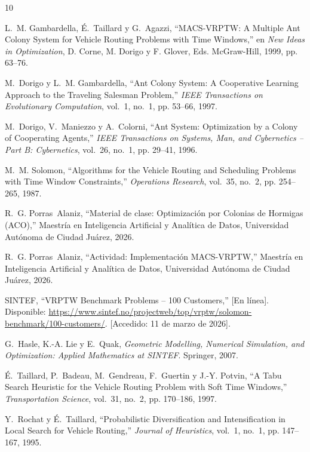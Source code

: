 \documentclass[12pt, letterpaper]{article}
\begin{document}
\begin{thebibliography}{10}

L.~M. Gambardella, É.~Taillard y G.~Agazzi,
``MACS-VRPTW: A Multiple Ant Colony System for Vehicle Routing Problems with Time Windows,''
en \textit{New Ideas in Optimization}, D. Corne, M. Dorigo y F. Glover, Eds.
McGraw-Hill, 1999, pp. 63--76.

M.~Dorigo y L.~M. Gambardella,
``Ant Colony System: A Cooperative Learning Approach to the Traveling Salesman Problem,''
\textit{IEEE Transactions on Evolutionary Computation}, vol.~1, no.~1, pp. 53--66, 1997.

M.~Dorigo, V.~Maniezzo y A.~Colorni,
``Ant System: Optimization by a Colony of Cooperating Agents,''
\textit{IEEE Transactions on Systems, Man, and Cybernetics -- Part B: Cybernetics}, vol.~26, no.~1, pp. 29--41, 1996.

M.~M. Solomon,
``Algorithms for the Vehicle Routing and Scheduling Problems with Time Window Constraints,''
\textit{Operations Research}, vol.~35, no.~2, pp. 254--265, 1987.

R.~G. Porras~Alaniz,
``Material de clase: Optimización por Colonias de Hormigas (ACO),''
Maestría en Inteligencia Artificial y Analítica de Datos, Universidad Autónoma de Ciudad Juárez, 2026.

R.~G. Porras~Alaniz,
``Actividad: Implementación MACS-VRPTW,''
Maestría en Inteligencia Artificial y Analítica de Datos, Universidad Autónoma de Ciudad Juárez, 2026.

SINTEF,
``VRPTW Benchmark Problems -- 100 Customers,''
[En línea]. Disponible: \url{https://www.sintef.no/projectweb/top/vrptw/solomon-benchmark/100-customers/}.
[Accedido: 11 de marzo de 2026].

G.~Hasle, K.-A. Lie y E.~Quak,
\textit{Geometric Modelling, Numerical Simulation, and Optimization: Applied Mathematics at SINTEF}.
Springer, 2007.

É.~Taillard, P.~Badeau, M.~Gendreau, F.~Guertin y J.-Y. Potvin,
``A Tabu Search Heuristic for the Vehicle Routing Problem with Soft Time Windows,''
\textit{Transportation Science}, vol.~31, no.~2, pp. 170--186, 1997.

Y.~Rochat y É.~Taillard,
``Probabilistic Diversification and Intensification in Local Search for Vehicle Routing,''
\textit{Journal of Heuristics}, vol.~1, no.~1, pp. 147--167, 1995.

\end{thebibliography}
\end{document}
